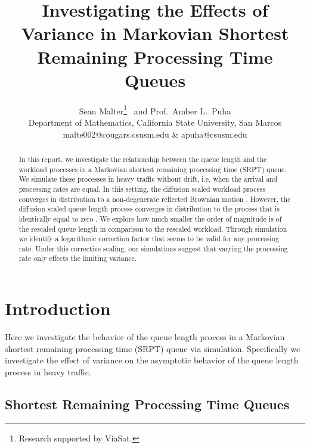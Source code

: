 \documentclass[12pt]{article}
\title{Investigating the Effects of Variance in Markovian Shortest Remaining Processing Time Queues}
\author{
Sean Malter\footnote{Research supported by ViaSat.} \ and Prof.\ Amber L.\ Puha\\
Department of Mathematics, California State University, San Marcos \\
\small{malte002@cougars.csusm.edu \& apuha@csusm.edu}
}
\theoremstyle{plain}
\theoremstyle{definition}
\theoremstyle{remark}
\begin{document}
\maketitle

\begin{abstract}
In this report, we investigate the relationship between the queue length and the workload processes in a
Markovian shortest remaining processing time (SRPT) queue.
We simulate these processes in heavy traffic without drift, i.e. when the arrival and processing rates are equal.
In this setting, the diffusion scaled workload process converges in distribution to a non-degenerate reflected
Brownian motion \cite{igl70}.
However, the diffusion scaled queue length process converges in distribution to the process that is identically equal
to zero \cite{gro11}. We explore how much smaller the order of magnitude is of the rescaled queue length in
comparison to the rescaled workload.
Through simulation we identify a logarithmic correction factor that seems to be valid for any processing rate.
Under this corrective scaling, our simulations suggest that varying the processing rate only effects the limiting variance.
\end{abstract}

\section{Introduction}

Here we investigate the behavior of the queue length process in a Markovian shortest remaining processing time (SRPT) queue via simulation.  Specifically we investigate the effect of variance on the asymptotic behavior of the queue length process in heavy traffic.

\subsection{Shortest Remaining Processing Time Queues}
\end{document}
